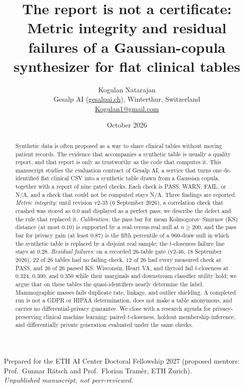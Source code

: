 \documentclass[11pt,a4paper]{article}
\title{The report is not a certificate:\\[0.3em]
\large Metric integrity and residual failures of a Gaussian-copula synthesizer for flat clinical tables}
\author{Kogulan Natarajan\\[0.2em]
\normalsize Gesalp AI (\href{https://gesalpai.ch}{gesalpai.ch}), Winterthur, Switzerland\\
\normalsize \href{mailto:Kogulan1@gmail.com}{Kogulan1@gmail.com}}
\date{October 2026}
\begin{document}
\maketitle

\begin{center}
\begin{minipage}{0.9\textwidth}
\small\centering
Prepared for the ETH AI Center Doctoral Fellowship 2027 (proposed mentors: Prof.\ Gunnar Rätsch and Prof.\ Florian Tramèr, ETH Zurich).\\
\emph{Unpublished manuscript, not peer-reviewed.}
\end{minipage}
\end{center}

\begin{abstract}
\noindent
Synthetic data is often proposed as a way to share clinical tables without moving patient records. The evidence that accompanies a synthetic table is usually a quality report, and that report is only as trustworthy as the code that computes it. This manuscript studies the evaluation contract of Gesalp AI, a service that turns one de-identified flat clinical CSV into a synthetic table drawn from a Gaussian copula, together with a report of nine gated checks. Each check is PASS, WARN, FAIL, or N/A, and a check that could not be computed stays N/A. Three findings are reported. \emph{Metric integrity:} until revision v2-35 (6 September 2026), a correlation check that crashed was stored as 0.0 and displayed as a perfect pass; we describe the defect and the rule that replaced it. \emph{Calibration:} the pass bar for mean Kolmogorov--Smirnov (KS) distance (at most 0.10) is supported by a real-versus-real null at $n \ge 200$, and the pass bar for privacy gain (at least 0.87) is the fifth percentile of a 960-draw null in which the synthetic table is replaced by a disjoint real sample; the $t$-closeness failure line stays at 0.28. \emph{Residual failures:} on a recorded 26-table gate (v2-46, 18 September 2026), 22 of 26 tables had no failing check, 12 of 26 had every measured check at PASS, and 26 of 26 passed KS. Wisconsin, Heart VA, and thyroid fail $t$-closeness at 0.324, 0.300, and 0.350 while their marginals and downstream classifier utility hold; we argue that on these tables the quasi-identifiers nearly determine the label. Mammographic masses fails duplicate rate, linkage, and outlier shielding. A completed run is not a GDPR or HIPAA determination, does not make a table anonymous, and carries no differential-privacy guarantee. We close with a research agenda for privacy-preserving clinical machine learning: paired $t$-closeness, holdout membership inference, and differentially private generation evaluated under the same checks.
\end{abstract}
\end{document}
